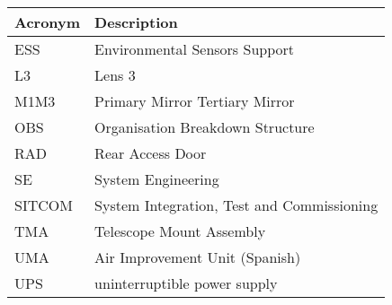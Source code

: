 \addtocounter{table}{-1}
\begin{longtable}{p{}p{}}\hline
\textbf{Acronym} & \textbf{Description}  \\\hline

ESS & Environmental Sensors Support \\\hline
L3 & Lens 3 \\\hline
M1M3 & Primary Mirror Tertiary Mirror \\\hline
OBS & Organisation Breakdown Structure \\\hline
RAD & Rear Access Door \\\hline
SE & System Engineering \\\hline
SITCOM & System Integration, Test and Commissioning \\\hline
TMA & Telescope Mount Assembly \\\hline
UMA & Air Improvement Unit (Spanish) \\\hline
UPS & uninterruptible power supply \\\hline
\end{longtable}
